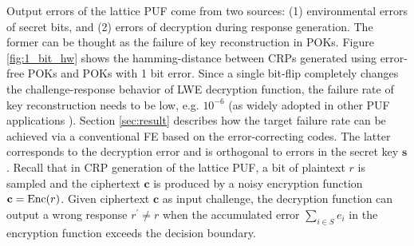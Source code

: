 Output errors of the lattice PUF come from two sources: (1) environmental errors of secret bits, and (2) errors of decryption during response generation.
The former can be thought as the failure of key reconstruction in POKs.
Figure \ref{fig:1_bit_hw} shows the hamming-distance between CRPs generated using error-free POKs and POKs with 1 bit error.
Since a single bit-flip completely changes the challenge-response behavior of LWE decryption function, the failure rate of key reconstruction needs to be low, e.g. $10^{-6}$ (as widely adopted in other PUF applications \cite{maes2012pufky}).
Section \ref{sec:result} describes how the target failure rate can be achieved via a conventional FE based on the error-correcting codes.
The latter corresponds to the decryption error and is orthogonal to errors in the secret key $\mathbf{s}$. 
Recall that in CRP generation of the lattice PUF, a bit of plaintext $r$ is sampled and the ciphertext $\mathbf{c}$ is produced by a noisy encryption function $\mathbf{c}=\Enc(r)$. 
Given ciphertext $\mathbf{c}$ as input challenge, the decryption function can output a wrong response $r^\prime\neq r$ when the accumulated error $\sum_{i\in S} e_i$ in the encryption function exceeds the decision boundary.


